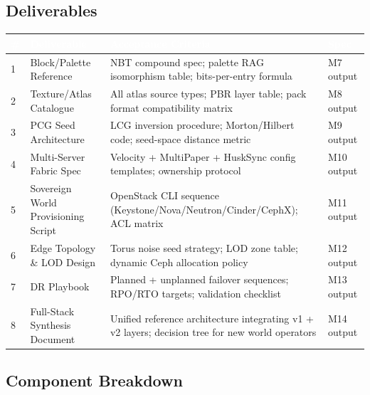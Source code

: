 \documentclass[11pt,letterpaper]{article}
\newcommand{\tableheader}[1]{\textbf{\sffamily\textcolor{white}{#1}}}
\begin{document}
\subsection{Deliverables}

\begin{center}
\begin{tabularx}{\textwidth}{C{0.5cm}L{3.5cm}XL{2.5cm}}
\toprule
{}
\tableheader{\#} & \tableheader{Deliverable} & \tableheader{Acceptance Criteria} & \tableheader{Spec} \\
 & Block/Palette Reference & NBT compound spec; palette RAG isomorphism table; bits-per-entry formula & M7 output \\
2 & Texture/Atlas Catalogue & All atlas source types; PBR layer table; pack format compatibility matrix & M8 output \\
3 & PCG Seed Architecture & LCG inversion procedure; Morton/Hilbert code; seed-space distance metric & M9 output \\
4 & Multi-Server Fabric Spec & Velocity + MultiPaper + HuskSync config templates; ownership protocol & M10 output \\
5 & Sovereign World Provisioning Script & OpenStack CLI sequence (Keystone/Nova/Neutron/Cinder/CephX); ACL matrix & M11 output \\
6 & Edge Topology \& LOD Design & Torus noise seed strategy; LOD zone table; dynamic Ceph allocation policy & M12 output \\
7 & DR Playbook & Planned + unplanned failover sequences; RPO/RTO targets; validation checklist & M13 output \\
8 & Full-Stack Synthesis Document & Unified reference architecture integrating v1 + v2 layers; decision tree for new world operators & M14 output \\
\bottomrule
\end{tabularx}
\end{center}

\subsection{Component Breakdown}
\end{document}
